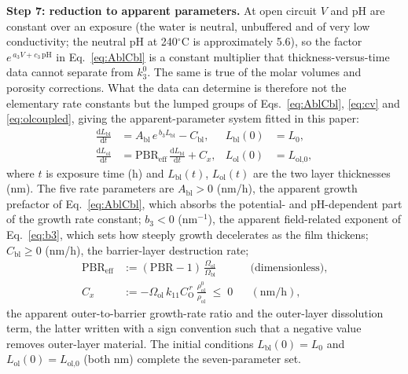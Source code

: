 \documentclass[a4paper,fleqn]{cas-sc}
\begin{document}
\textbf{Step 7: reduction to apparent parameters.} At open circuit $V$
and pH are constant over an exposure (the water is neutral, unbuffered
and of very low conductivity; the neutral pH at 240$^\circ$C is
approximately 5.6), so the factor $e^{\,a_3 V + c_3\,\mathrm{pH}}$ in
Eq.~\eqref{eq:AblCbl} is a constant multiplier that thickness-versus-time
data cannot separate from $k_3^0$. The same is true of the molar volumes
and porosity corrections. What the data can determine is therefore not
the elementary rate constants but the lumped groups of
Eqs.~\eqref{eq:AblCbl}, \eqref{eq:cv} and \eqref{eq:olcoupled}, giving
the apparent-parameter system fitted in this paper:
\begin{align}
\frac{\mathrm{d}L_\text{bl}}{\mathrm{d}t} &=
A_\text{bl}\, e^{\,b_3 L_\text{bl}} - C_\text{bl},
& L_\text{bl}(0) &= L_0,
\label{eq:odebl}\\
\frac{\mathrm{d}L_\text{ol}}{\mathrm{d}t} &=
\mathrm{PBR}_\text{eff}\,
\frac{\mathrm{d}L_\text{bl}}{\mathrm{d}t} + C_x,
& L_\text{ol}(0) &= L_\text{ol,0},
\label{eq:odeol}
\end{align}
where $t$ is exposure time (h) and $L_\text{bl}(t)$, $L_\text{ol}(t)$
are the two layer thicknesses (nm). The five rate parameters are
$A_\text{bl}>0$ (nm/h), the apparent growth prefactor of
Eq.~\eqref{eq:AblCbl}, which absorbs the potential- and pH-dependent
part of the growth rate constant; $b_3<0$ (nm$^{-1}$), the apparent
field-related exponent of Eq.~\eqref{eq:b3}, which sets how steeply
growth decelerates as the film thickens; $C_\text{bl}\ge0$
(nm/h), the barrier-layer destruction rate;
\begin{equation}
\begin{aligned}
\mathrm{PBR}_\text{eff} &:= (\mathrm{PBR}-1)\,
\frac{\Omega_\text{ol}}{\Omega_\text{bl}}
&&\text{(dimensionless)},\\[2pt]
C_x &:= -\Omega_\text{ol}\, k_{11} C_\mathrm{O}^{\,r}\,
\frac{\rho^0_\text{ol}}{\rho_\text{ol}} \;\le\; 0
&&(\mathrm{nm/h}),
\end{aligned}
\label{eq:pbreffCx}
\end{equation}
the apparent outer-to-barrier growth-rate ratio and the outer-layer
dissolution term, the latter written with a sign convention such that a
negative value removes outer-layer material. The initial conditions
$L_\text{bl}(0)=L_0$ and $L_\text{ol}(0)=L_\text{ol,0}$ (both nm)
complete the seven-parameter set.
\end{document}
